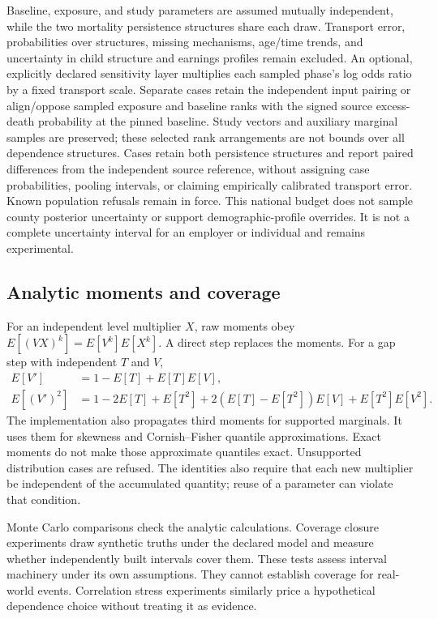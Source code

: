 \documentclass[10pt]{article}
\begin{document}
Baseline, exposure, and study parameters are assumed mutually independent,
while the two mortality persistence structures share each draw. Transport
error, probabilities over structures, missing mechanisms, age/time trends,
and uncertainty in child structure and earnings profiles remain excluded.
An optional, explicitly declared sensitivity layer multiplies each sampled
phase's log odds ratio by a fixed transport scale. Separate cases retain the
independent input pairing or align/oppose sampled exposure and baseline ranks
with the signed source excess-death probability at the pinned baseline.
Study vectors and auxiliary marginal samples are preserved; these selected
rank arrangements are not bounds over all dependence structures. Cases retain
both persistence structures and report paired differences from the independent
source reference, without assigning case probabilities, pooling intervals,
or claiming empirically calibrated transport error. Known population refusals
remain in force. %
This national budget does not sample county posterior uncertainty or
support demographic-profile overrides. It is not a complete uncertainty
interval for an employer or individual and remains experimental.

\subsection{Analytic moments and coverage}
For an independent level multiplier $X$, raw moments obey
$E[(VX)^k]=E[V^k]E[X^k]$. A direct step replaces the moments. For a gap
step with independent $T$ and $V$,
\begin{align}
 E[V'] &= 1-E[T]+E[T]E[V],\\
 E[(V')^2] &= 1-2E[T]+E[T^2]
 +2(E[T]-E[T^2])E[V]+E[T^2]E[V^2].
\end{align}
The implementation also propagates third moments for supported
marginals. It uses them for skewness and Cornish--Fisher quantile
approximations. Exact moments do not make those approximate quantiles
exact. Unsupported distribution cases are refused. The identities also
require that each new multiplier be independent of the accumulated
quantity; reuse of a parameter can violate that condition.

Monte Carlo comparisons check the analytic calculations. Coverage closure
experiments draw synthetic truths under the declared model and measure
whether independently built intervals cover them. These tests assess
interval machinery under its own assumptions. They cannot establish
coverage for real-world events. Correlation stress experiments similarly
price a hypothetical dependence choice without treating it as evidence.
\end{document}

